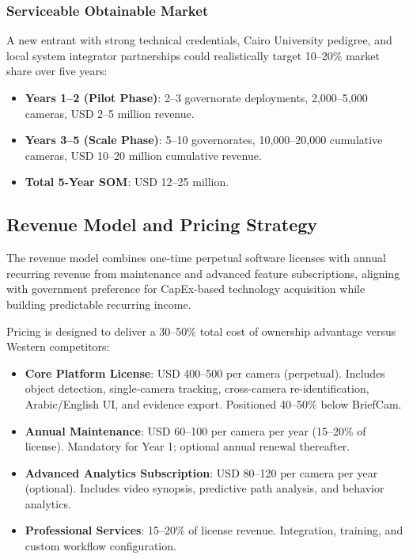 \subsubsection{Serviceable Obtainable Market}

A new entrant with strong technical credentials, Cairo University pedigree, and local system integrator partnerships could realistically target 10--20\% market share over five years:
\begin{itemize}
    \item \textbf{Years 1--2 (Pilot Phase)}: 2--3 governorate deployments, 2,000--5,000 cameras, USD 2--5 million revenue.
    \item \textbf{Years 3--5 (Scale Phase)}: 5--10 governorates, 10,000--20,000 cumulative cameras, USD 10--20 million cumulative revenue.
    \item \textbf{Total 5-Year SOM}: USD 12--25 million.
\end{itemize}

\subsection{Revenue Model and Pricing Strategy}

The revenue model combines one-time perpetual software licenses with annual recurring revenue from maintenance and advanced feature subscriptions, aligning with government preference for CapEx-based technology acquisition while building predictable recurring income.

Pricing is designed to deliver a 30--50\% total cost of ownership advantage versus Western competitors:
\begin{itemize}
    \item \textbf{Core Platform License}: USD 400--500 per camera (perpetual). Includes object detection, single-camera tracking, cross-camera re-identification, Arabic/English UI, and evidence export. Positioned 40--50\% below BriefCam.
    \item \textbf{Annual Maintenance}: USD 60--100 per camera per year (15--20\% of license). Mandatory for Year 1; optional annual renewal thereafter.
    \item \textbf{Advanced Analytics Subscription}: USD 80--120 per camera per year (optional). Includes video synopsis, predictive path analysis, and behavior analytics.
    \item \textbf{Professional Services}: 15--20\% of license revenue. Integration, training, and custom workflow configuration.
\end{itemize}

